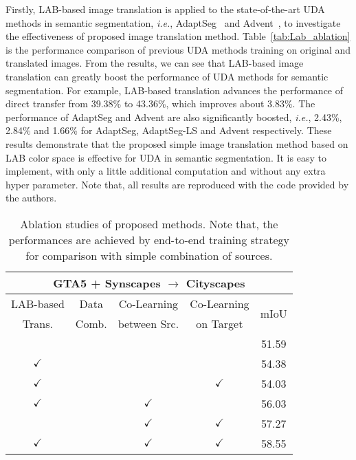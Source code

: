 \documentclass[final]{cvpr}
\def\ie{\textit{i.e.}}
\begin{document}
Firstly, LAB-based image translation is applied to the state-of-the-art UDA methods in semantic segmentation, \ie, AdaptSeg~\cite{tsai2018learning} and Advent~\cite{vu2019advent}, to investigate the effectiveness of proposed image translation method.
Table~\ref{tab:Lab_ablation} is the performance comparison of previous UDA methods training on original and translated images.
From the results, we can see that LAB-based image translation can greatly boost the performance of UDA methods for semantic segmentation. 
For example, LAB-based translation advances the performance of direct transfer from 39.38\% to 43.36\%, which improves about 3.83\%. The performance of AdaptSeg and Advent are also significantly boosted, \ie, 2.43\%, 2.84\% and 1.66\% for AdaptSeg, AdaptSeg-LS and Advent respectively. These results demonstrate that the proposed simple image translation method based on LAB color space is effective for UDA in semantic segmentation. It is easy to implement, with only a little additional computation and without any extra hyper parameter. Note that, all results are reproduced with the code provided by the authors.

\begin{table}[t]
	\centering
	\caption{Ablation studies of proposed methods. Note that, the performances are achieved by end-to-end training strategy for comparison with simple combination of sources.
	}
	\label{tab:combine_ablation}
	\vspace{1mm}
\setlength{\tabcolsep}{1mm}
\begin{tabular}{cccc|c}
		\hline
		\multicolumn{5}{c}{GTA5 + Synscapes $\rightarrow$ Cityscapes} \\ 
		\hline
LAB-based & Data & Co-Learning & Co-Learning &\multirow{2}{*}{mIoU} \\
		Trans. & Comb. & between Src. & on Target & \\
		\hline
		& \checkmark &  & & 51.59 \\
		$\checkmark$ & \checkmark & & & 54.38 \\
		\hline
		$\checkmark$ &  &  & $\checkmark$  & 54.03\\
		$\checkmark$ & & $\checkmark$ & & 56.03 \\
		& & $\checkmark$ & $\checkmark$ &  57.27 \\
		$\checkmark$ & & $\checkmark$ & $\checkmark$ & 58.55 \\
		\hline
	\end{tabular}
	\vspace{-10pt}
\end{table}
\end{document}
